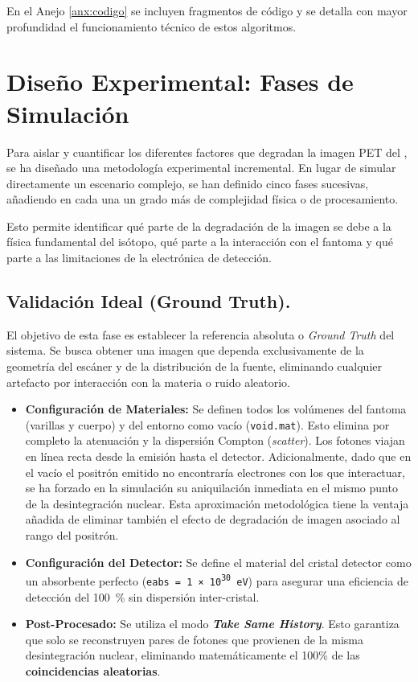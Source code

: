 En el Anejo \ref{anx:codigo} se incluyen fragmentos de código y se detalla con mayor profundidad el funcionamiento técnico de estos algoritmos.

\section{Diseño Experimental: Fases de Simulación}
\label{sec:metodologia:fases}

Para aislar y cuantificar los diferentes factores que degradan la imagen PET del \yochoseis, se ha diseñado una metodología experimental incremental. En lugar de simular directamente un escenario complejo, se han definido cinco fases sucesivas, añadiendo en cada una un grado más de complejidad física o de procesamiento.

Esto permite identificar qué parte de la degradación de la imagen se debe a la física fundamental del isótopo, qué parte a la interacción con el fantoma y qué parte a las limitaciones de la electrónica de detección.

\subsection{Validación Ideal (Ground Truth).}
\label{subsec:fase1}

El objetivo de esta fase es establecer la referencia absoluta o \textit{Ground Truth} del sistema. Se busca obtener una imagen que dependa exclusivamente de la geometría del escáner y de la distribución de la fuente, eliminando cualquier artefacto por interacción con la materia o ruido aleatorio.

\begin{itemize}
  \item \textbf{Configuración de Materiales:} Se definen todos los volúmenes del fantoma (varillas y cuerpo) y del entorno como vacío (\texttt{void.mat}). Esto elimina por completo la atenuación y la dispersión Compton (\textit{scatter}). Los fotones viajan en línea recta desde la emisión hasta el detector. Adicionalmente, dado que en el vacío el positrón emitido no encontraría electrones con los que interactuar, se ha forzado en la simulación su aniquilación inmediata en el mismo punto de la desintegración nuclear. Esta aproximación metodológica tiene la ventaja añadida de eliminar también el efecto de degradación de imagen asociado al rango del positrón.
  \item \textbf{Configuración del Detector:} Se define el material del cristal detector como un absorbente perfecto (\texttt{eabs = \SI{1e30}{\electronvolt}}) para asegurar una eficiencia de detección del \SI{100}{\percent} sin dispersión inter-cristal.
  \item \textbf{Post-Procesado:} Se utiliza el modo \textbf{\textit{Take Same History}}. Esto garantiza que solo se reconstruyen pares de fotones que provienen de la misma desintegración nuclear, eliminando matemáticamente el 100\% de las \textbf{coincidencias aleatorias}.
\end{itemize}

